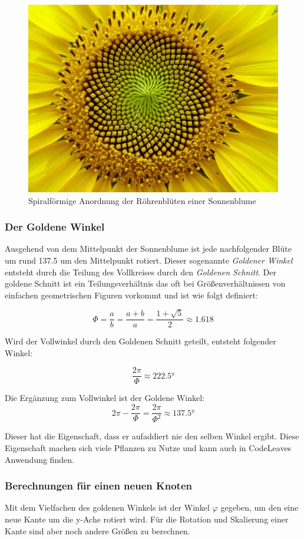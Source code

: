 \begin{figure}[htb]
  \includegraphics[width=.5\textwidth]{figures/sunflower-seeds}
  \caption{Spiralförmige Anordnung der Röhrenblüten einer Sonnenblume \cite{blender2017howto}}
  \label{fig:sunflower-seeds}
\end{figure}

\subsubsection*{Der Goldene Winkel}
Ausgehend von dem Mittelpunkt der Sonnenblume ist jede nachfolgender Blüte um rund 137.5 um den Mittelpunkt rotiert. Dieser sogenannte \textit{Goldener Winkel} entsteht durch die Teilung des Vollkreises durch den \textit{Goldenen Schnitt}. Der goldene Schnitt ist ein Teilungsverhältnis das oft bei Größenverhältnissen von einfachen geometrischen Figuren vorkommt und ist wie folgt definiert:

\begin{equation}
  \Phi = \frac{a}{b} = \frac{a + b}{a} = \frac{1 + \sqrt{5}}{2} \approx 1.618
\end{equation}

Wird der Vollwinkel durch den Goldenen Schnitt geteilt, entsteht folgender Winkel:

\begin{equation}
  \frac{2\pi}{\Phi} \approx \ang{222.5}
\end{equation}

Die Ergänzung zum Vollwinkel ist der Goldene Winkel:
\begin{equation}
  2\pi - \frac{2\pi}{\Phi} = \frac{2\pi}{\Phi^2} \approx \ang{137.5}
\end{equation}

Dieser hat die Eigenschaft, dass er aufaddiert nie den selben Winkel ergibt. Diese Eigenschaft machen sich viele Pflanzen zu Nutze und kann auch in CodeLeaves Anwendung finden.

\subsubsection*{Berechnungen für einen neuen Knoten}
Mit dem Vielfachen des goldenen Winkels ist der Winkel $\varphi$ gegeben, um den eine neue Kante um die y-Ache rotiert wird. Für die Rotation und Skalierung einer Kante sind aber noch andere Größen zu berechnen.

